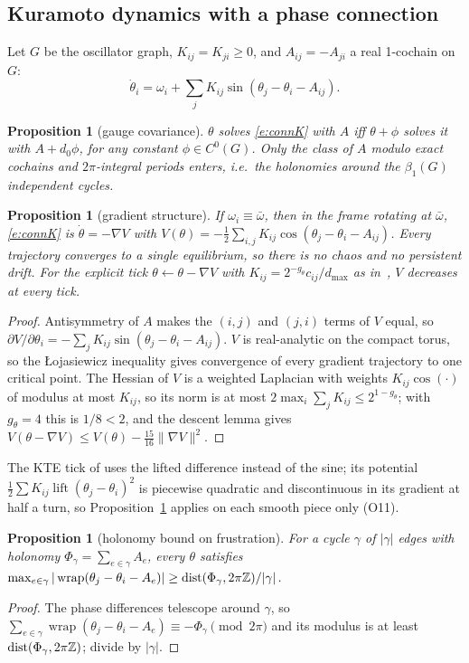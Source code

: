 \documentclass[10pt]{article}
\newtheorem{prop}[thm]{Proposition}
\theoremstyle{definition}
\newcommand{\code}[1]{\texttt{\detokenize{#1}}}
\DeclareMathOperator{\wrap}{wrap}\DeclareMathOperator{\im}{im}\DeclareMathOperator{\dist}{dist}
\begin{document}
\subsection{Kuramoto dynamics with a phase connection}
Let $G$ be the oscillator graph, $K_{ij}=K_{ji}\ge0$, and $A_{ij}=-A_{ji}$ a real 1-cochain on $G$:
\begin{equation}\label{e:connK}
\dot\theta_i=\omega_i+\sum_jK_{ij}\sin(\theta_j-\theta_i-A_{ij}).
\end{equation}
\begin{prop}[gauge covariance]\label{p:cov}
$\theta$ solves \eqref{e:connK} with $A$ iff $\theta+\phi$ solves it with $A+d_0\phi$, for any constant $\phi\in C^0(G)$. Only the class of $A$ modulo exact cochains and $2\pi$-integral periods enters, i.e.\ the holonomies around the $\beta_1(G)$ independent cycles.
\end{prop}
\begin{prop}[gradient structure]\label{p:grad}
If $\omega_i\equiv\bar\omega$, then in the frame rotating at $\bar\omega$, \eqref{e:connK} is $\dot\theta=-\nabla V$ with $V(\theta)=-\frac12\sum_{i,j}K_{ij}\cos(\theta_j-\theta_i-A_{ij})$. Every trajectory converges to a single equilibrium, so there is no chaos and no persistent drift. For the explicit tick $\theta\leftarrow\theta-\nabla V$ with $K_{ij}=2^{-g_\theta}c_{ij}/d_{\max}$ as in~\cite{pv2}, $V$ decreases at every tick.
\end{prop}
\begin{proof}
Antisymmetry of $A$ makes the $(i,j)$ and $(j,i)$ terms of $V$ equal, so $\partial V/\partial\theta_i=-\sum_jK_{ij}\sin(\theta_j-\theta_i-A_{ij})$. $V$ is real-analytic on the compact torus, so the \L{}ojasiewicz inequality gives convergence of every gradient trajectory to one critical point. The Hessian of $V$ is a weighted Laplacian with weights $K_{ij}\cos(\cdot)$ of modulus at most $K_{ij}$, so its norm is at most $2\max_i\sum_jK_{ij}\le2^{1-g_\theta}$; with $g_\theta=4$ this is $1/8<2$, and the descent lemma gives $V(\theta-\nabla V)\le V(\theta)-\frac{15}{16}\|\nabla V\|^2$.
\end{proof}
\noindent The KTE tick of \code{dtft.go} uses the lifted difference instead of the sine; its potential $\frac12\sum K_{ij}\operatorname{lift}(\theta_j-\theta_i)^2$ is piecewise quadratic and discontinuous in its gradient at half a turn, so Proposition~\ref{p:grad} applies on each smooth piece only (O11).

\begin{prop}[holonomy bound on frustration]\label{p:frust}
For a cycle $\gamma$ of $|\gamma|$ edges with holonomy $\Phi_\gamma=\sum_{e\in\gamma}A_e$, every $\theta$ satisfies $\max_{e\in\gamma}|\wrap(\theta_j-\theta_i-A_e)|\ge\dist(\Phi_\gamma,2\pi\Z)/|\gamma|$.
\end{prop}
\begin{proof}
The phase differences telescope around $\gamma$, so $\sum_{e\in\gamma}\wrap(\theta_j-\theta_i-A_e)\equiv-\Phi_\gamma\pmod{2\pi}$ and its modulus is at least $\dist(\Phi_\gamma,2\pi\Z)$; divide by $|\gamma|$.
\end{proof}
\end{document}
